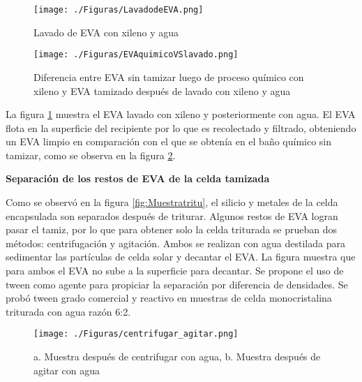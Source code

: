  \begin{figure}[htb]
	\begin{center}
		\texttt{[image: ./Figuras/LavadodeEVA.png]}
	\end{center}
	\vspace{-1em} %
	\caption{Lavado de EVA con xileno y agua}
	\label{fig:LavadoEVA}
\end{figure}


 \begin{figure}[htb]
	\begin{center}
		\texttt{[image: ./Figuras/EVAquimicoVSlavado.png]}
	\end{center}
	\vspace{-1em} %
	\caption{Diferencia entre EVA sin tamizar luego de proceso químico con xileno y EVA tamizado después de lavado con xileno y agua}
	\label{fig:EvaqumicoVSlavado}
\end{figure}

La figura \ref{fig:LavadoEVA} muestra el EVA lavado con xileno y posteriormente con agua. El EVA flota en la superficie del recipiente por lo que es recolectado y filtrado, obteniendo un EVA limpio en comparación con el que se obtenía en el baño químico sin tamizar, como se observa en la figura \ref{fig:EvaqumicoVSlavado}.


\textbf{Separación de los restos de EVA de la celda tamizada}

Como se observó en la figura \ref{fig:Muestratritu}, el silicio y metales de la celda encapsulada son separados después de triturar. Algunos restos de EVA logran pasar el tamiz, por lo que para obtener solo la celda triturada se prueban dos métodos: centrifugación y agitación. Ambos se realizan con agua destilada para sedimentar las partículas de celda solar y decantar el EVA. La figura muestra que para ambos el EVA no sube a la superficie para decantar. 
Se propone el uso de tween como agente para propiciar la separación por diferencia de densidades. Se probó tween grado comercial y reactivo en muestras de celda monocristalina triturada con agua razón 6:2. 

                        
\begin{figure}[htb]
	\begin{center}
		\texttt{[image: ./Figuras/centrifugar\_agitar.png]}
	\end{center}
	\vspace{-1em} %
	\caption{a. Muestra después de centrifugar con agua, b. Muestra después de agitar con agua}
	\label{fig:muestracentrifugadayagitada}
\end{figure}

